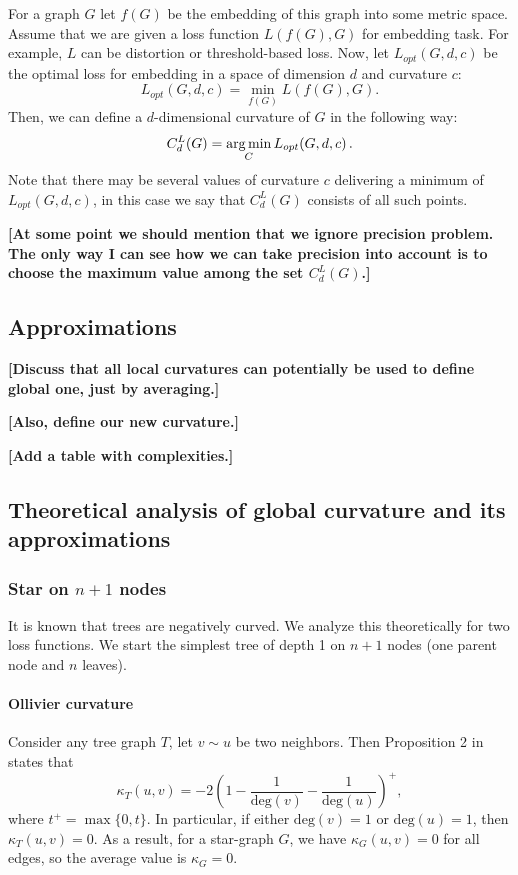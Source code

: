 \documentclass{article} %
\begin{document}
For a graph $G$ let $f(G)$ be the embedding of this graph into some metric space. Assume that we are given a loss function $L(f(G),G)$ for embedding task. For example, $L$ can be distortion or threshold-based loss. 
Now, let $L_{opt}(G,d,c)$ be the optimal loss for embedding in a space of dimension $d$ and curvature $c$:
\[
L_{opt}(G,d,c) = \min_{f(G)} L(f(G),G).
\]
Then, we can define a $d$-dimensional curvature of $G$ in the following way:
\[
C_{d}^{L}(G) = \operatorname*{arg\,min}_C L_{opt}(G,d,c)\,.
\]
Note that there may be several values of curvature $c$ delivering a minimum of $L_{opt}(G,d,c)$, in this case we say that  $C_{d}^{L}(G)$ consists of all such points.

\textbf{[At some point we should mention that we ignore precision problem. The only way I can see how we can take precision into account is to choose the maximum value among the set $C_d^L(G)$.]}

\subsection{Approximations}

\textbf{[Discuss that all local curvatures can potentially be used to define global one, just by averaging.]} 

\textbf{[Also, define our new curvature.]}

\textbf{[Add a table with complexities.]}

\subsection{Theoretical analysis of global curvature and its approximations}

\subsubsection{Star on $n+1$ nodes}

It is known that trees are negatively curved. 
We analyze this theoretically for two loss functions. We start the simplest tree of depth 1 on $n+1$ nodes (one parent node and $n$ leaves).

\paragraph{Ollivier curvature} 
Consider any tree graph $T$, let $v \sim u$ be two neighbors. Then Proposition 2 in~\citep{jost2014ollivier} states that
\begin{equation}\label{eq:ollivier_tree}
	\kappa_T(u,v) = -2\left(1 - \frac{1}{\mathrm{deg}(v)} - \frac{1}{\mathrm{deg}(u)}\right)^+, 
\end{equation}
where $t^+ = \max\{0,t\}$. In particular, if either $\mathrm{deg}(v) = 1$ or $\mathrm{deg}(u) = 1$, then $\kappa_T(u,v) = 0$.  As a result, for a star-graph $G$, we have $\kappa_G(u,v) = 0$ for all edges, so the average value is $\kappa_G = 0$.
\end{document}
